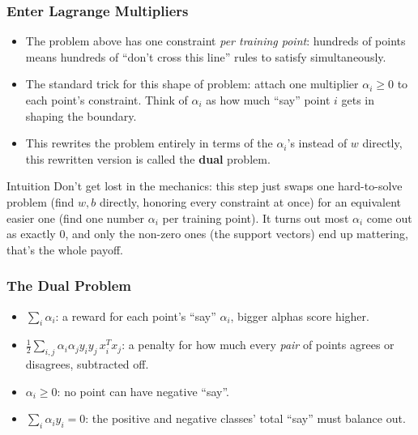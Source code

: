 \begin{frame}[fragile] \frametitle{Enter Lagrange Multipliers}
\begin{itemize}
\item The problem above has one constraint \emph{per training point}: hundreds of points means hundreds of ``don't cross this line'' rules to satisfy simultaneously.
\item The standard trick for this shape of problem: attach one multiplier $\alpha_i \geq 0$ to each point's constraint. Think of $\alpha_i$ as how much ``say'' point $i$ gets in shaping the boundary.
\item This rewrites the problem entirely in terms of the $\alpha_i$'s instead of $w$ directly, this rewritten version is called the \textbf{dual} problem.
\end{itemize}
\begin{block}{Intuition}
Don't get lost in the mechanics: this step just swaps one hard-to-solve problem (find $w,b$
directly, honoring every constraint at once) for an equivalent easier one (find one number
$\alpha_i$ per training point). It turns out most $\alpha_i$ come out as exactly 0, and only
the non-zero ones (the support vectors) end up mattering, that's the whole payoff.
\end{block}
\end{frame}

\begin{frame}[fragile] \frametitle{The Dual Problem}
\begin{center}
\end{center}
\begin{itemize}
\item $\sum_i \alpha_i$: a reward for each point's ``say'' $\alpha_i$, bigger alphas score higher.
\item $\frac{1}{2}\sum_{i,j}\alpha_i\alpha_j y_iy_j\,x_i^Tx_j$: a penalty for how much every \emph{pair} of points agrees or disagrees, subtracted off.
\item $\alpha_i\geq0$: no point can have negative ``say''.
\item $\sum_i \alpha_i y_i = 0$: the positive and negative classes' total ``say'' must balance out.
\end{itemize}
\end{frame}

